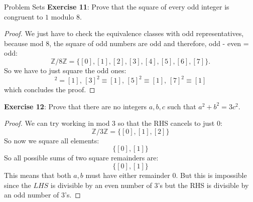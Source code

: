 \documentclass{report}
\begin{document}
\begin{exercises}{Problem Sets}
    \textbf{Exercise 11}: Prove that the square of every odd integer is congruent to $1$ modulo $8$.
        \begin{proof}
            We just have to check the equivalence classes with odd representatives, because mod 8, the square of odd numbers are odd and therefore, odd - even = odd:
                \begin{equation*}
                    \mathbb{Z}/8\mathbb{Z} = \{[0], [1], [2], [3], [4], [5], [6], [7]\}.
                \end{equation*}
            So we have to just square the odd ones:
                \begin{equation*}
                    [1]^{2} = [1], \, [3]^{2} \equiv [1], \, [5]^{2} \equiv [1], \, [7]^{2} \equiv [1]
                \end{equation*}
            which concludes the proof.
        \end{proof}

    \textbf{Exercise 12}: Prove that there are no integers $a, b, c$ such that $a^{2} + b^{2} = 3c^{2}$.
        \begin{proof}
            We can try working in mod 3 so that the RHS cancels to just 0:
                \begin{equation*}
                    \mathbb{Z}/3\mathbb{Z} = \{[0], [1], [2]\}
                \end{equation*}
            So now we square all elements:
                \begin{equation*}
                    \{[0], [1]\}
                \end{equation*}
            So all possible sums of two square remainders are:
                \begin{equation*}
                    \{[0], [1]\}
                \end{equation*}
            This means that both $a, b$ must have either remainder $0$. But this is impossible since the $LHS$ is divisible by an even number of $3$'s but the RHS is divisible by an odd number of $3$'s.
        \end{proof}


\end{exercises}
\end{document}
